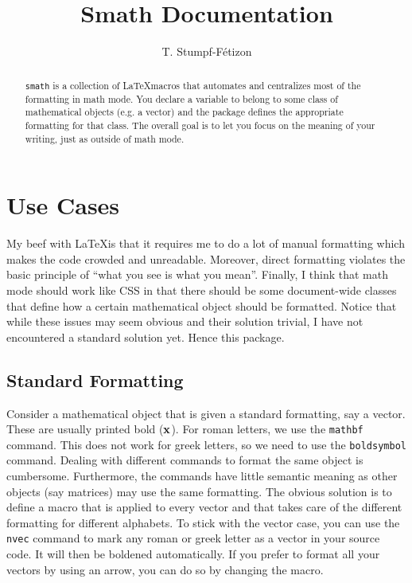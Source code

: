 \documentclass[a4paper,10pt]{scrartcl}
\title{Smath Documentation}
\author{T. Stumpf-Fétizon}
\begin{document}
\maketitle

\begin{abstract}
\texttt{smath} is a collection of \LaTeX macros that automates and centralizes most of the formatting in math mode. You declare a variable to belong to some class of mathematical objects (e.g. a vector) and the package defines the appropriate formatting for that class. The overall goal is to let you focus on the meaning of your writing, just as outside of math mode.
\end{abstract}

\section{Use Cases}
My beef with \LaTeX is that it requires me to do a lot of manual formatting which makes the code crowded and unreadable. Moreover, direct formatting violates the basic principle of ``what you see is what you mean''. Finally, I think that math mode should work like CSS in that there should be some document-wide classes that define how a certain mathematical object should be formatted. Notice that while these issues may seem obvious and their solution trivial, I have not encountered a standard solution yet. Hence this package.
\subsection{Standard Formatting}
Consider a mathematical object that is given a standard formatting, say a vector. These are usually printed bold ($\boldsymbol{\mathbf{x}}$). For roman letters, we use the \texttt{mathbf} command. This does not work for greek letters, so we need to use the \texttt{boldsymbol} command. Dealing with different commands to format the same object is cumbersome. Furthermore, the commands have little semantic meaning as other objects (say matrices) may use the same formatting. The obvious solution is to define a macro that is applied to every vector and that takes care of the different formatting for different alphabets. To stick with the vector case, you can use the \texttt{nvec} command to mark any roman or greek letter as a vector in your source code. It will then be boldened automatically. If you prefer to format all your vectors by using an arrow, you can do so by changing the macro.
\end{document}

